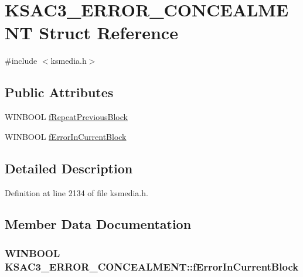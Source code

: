 \hypertarget{struct_k_s_a_c3___e_r_r_o_r___c_o_n_c_e_a_l_m_e_n_t}{}\section{K\+S\+A\+C3\+\_\+\+E\+R\+R\+O\+R\+\_\+\+C\+O\+N\+C\+E\+A\+L\+M\+E\+NT Struct Reference}
\label{struct_k_s_a_c3___e_r_r_o_r___c_o_n_c_e_a_l_m_e_n_t}


{\ttfamily \#include $<$ksmedia.\+h$>$}

\subsection*{Public Attributes}
\begin{DoxyCompactItemize}
\item 
W\+I\+N\+B\+O\+OL \hyperlink{struct_k_s_a_c3___e_r_r_o_r___c_o_n_c_e_a_l_m_e_n_t_a87223bc207eb1e67739cb015a59033ad}{f\+Repeat\+Previous\+Block}
\item 
W\+I\+N\+B\+O\+OL \hyperlink{struct_k_s_a_c3___e_r_r_o_r___c_o_n_c_e_a_l_m_e_n_t_a5c8506dc08e0c80d2945b97ad93f50e2}{f\+Error\+In\+Current\+Block}
\end{DoxyCompactItemize}


\subsection{Detailed Description}


Definition at line 2134 of file ksmedia.\+h.



\subsection{Member Data Documentation}
\subsubsection[{\texorpdfstring{f\+Error\+In\+Current\+Block}{fErrorInCurrentBlock}}]{\setlength{\rightskip}{0pt plus 5cm}W\+I\+N\+B\+O\+OL K\+S\+A\+C3\+\_\+\+E\+R\+R\+O\+R\+\_\+\+C\+O\+N\+C\+E\+A\+L\+M\+E\+N\+T\+::f\+Error\+In\+Current\+Block}\hypertarget{struct_k_s_a_c3___e_r_r_o_r___c_o_n_c_e_a_l_m_e_n_t_a5c8506dc08e0c80d2945b97ad93f50e2}{}\label{struct_k_s_a_c3___e_r_r_o_r___c_o_n_c_e_a_l_m_e_n_t_a5c8506dc08e0c80d2945b97ad93f50e2}



